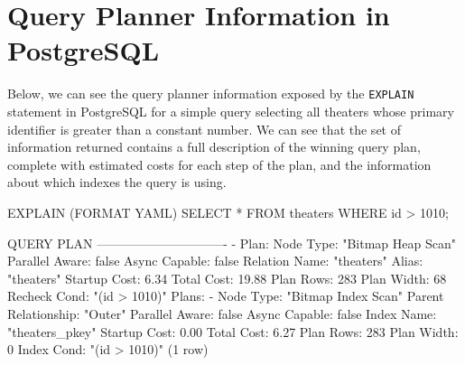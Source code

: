 \section{Query Planner Information in PostgreSQL}
\label{attachment:plannerpostgresql}

Below, we can see the query planner information exposed by the \texttt{EXPLAIN} statement in PostgreSQL for a simple query selecting all theaters whose primary identifier is greater than a constant number.
We can see that the set of information returned contains a full description of the winning query plan, complete with estimated costs for each step of the plan, and the information about which indexes the query is using.

\begin{code}
EXPLAIN (FORMAT YAML) SELECT * FROM theaters WHERE id > 1010;

          QUERY PLAN
-------------------------------
 - Plan: 
    Node Type: "Bitmap Heap Scan"
    Parallel Aware: false
    Async Capable: false
    Relation Name: "theaters"
    Alias: "theaters"
    Startup Cost: 6.34
    Total Cost: 19.88
    Plan Rows: 283
    Plan Width: 68
    Recheck Cond: "(id > 1010)"
    Plans: 
      - Node Type: "Bitmap Index Scan"
        Parent Relationship: "Outer"
        Parallel Aware: false
        Async Capable: false
        Index Name: "theaters_pkey"
        Startup Cost: 0.00
        Total Cost: 6.27
        Plan Rows: 283
        Plan Width: 0
        Index Cond: "(id > 1010)"   
(1 row)
\end{code}
